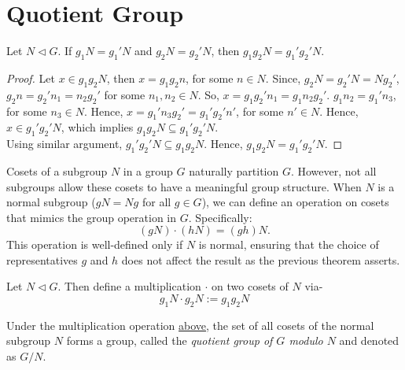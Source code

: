 \section{Quotient Group}
\begin{theorem}
    Let $N\lhd G$. If $g_1N = g_1'N$ and $g_2N = g_2'N$, then $g_1g_2N = g_1'g_2'N$.
\end{theorem}
\begin{proof}
Let $x \in g_1g_2N$, then $x = g_1g_2n$, for some $n \in N$. Since, $g_2N = g_2'N = Ng_2'$, $g_2n = g_2'n_1 = n_2g_2'$ for some $n_1, n_2 \in N$. So, $x = g_1g_2'n_1 = g_1n_2g_2'$. $g_1n_2 = g_1'n_3$, for some $n_3 \in N$. Hence, $x = g_1'n_3g_2' = g_1'g_2'n'$, for some $n' \in N$. Hence, $x \in g_1'g_2'N$, which implies $g_1g_2N \subseteq g_1'g_2'N$.\\
Using similar argument, $g_1'g_2'N \subseteq g_1g_2N$. Hence, $g_1g_2N = g_1'g_2'N$.
\end{proof}
Cosets of a subgroup $N$ in a group $G$ naturally partition $G$. However, not all subgroups allow these cosets to have a meaningful group structure. When $N$ is a normal subgroup ($gN=Ng$ for all $g \in G$), we can define an operation on cosets that mimics the group operation in $G$. Specifically: $$(gN) \cdot (hN)=(gh)N.$$
This operation is well-defined only if $N$ is normal, ensuring that the choice of representatives $g$ and $h$ does not affect the result as the previous theorem asserts.
\begin{definition}
    \label{def:quotientop}
    Let $N \lhd G$. Then define a multiplication $\cdot$ on two cosets of $N$ via-
    $$g_1N \cdot g_2N:=g_1g_2N$$
\end{definition}
\begin{theorem}
    Under the multiplication operation \hyperref[def:quotientop]{above}, the set of all cosets of the normal subgroup $N$ forms a group, called the \textit{quotient group of $G$ modulo $N$} and denoted as $G/N$.
\end{theorem}

